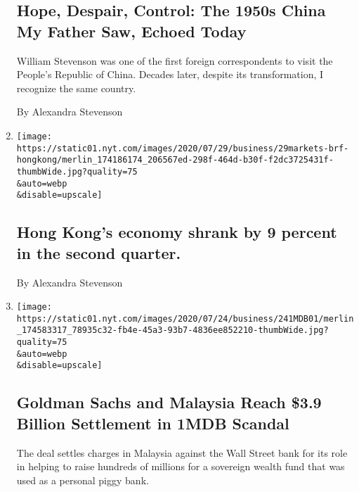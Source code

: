 \begin{enumerate}
  \hypertarget{hope-despair-control-the-1950s-china-my-father-saw-echoed-today}{%
  \subsection{Hope, Despair, Control: The 1950s China My Father Saw,
  Echoed
  Today}\label{hope-despair-control-the-1950s-china-my-father-saw-echoed-today}}

  William Stevenson was one of the first foreign correspondents to visit
  the People's Republic of China. Decades later, despite its
  transformation, I recognize the same country.

  By Alexandra Stevenson
\item
  \href{/2020/07/29/business/hong-kongs-economy-shrank-by-9-percent-in-the-second-quarter.html}{}

  \texttt{[image: https://static01.nyt.com/images/2020/07/29/business/29markets-brf-hongkong/merlin\_174186174\_206567ed-298f-464d-b30f-f2dc3725431f-thumbWide.jpg?quality=75\\\&auto=webp\\\&disable=upscale]}

  \hypertarget{hong-kongs-economy-shrank-by-9-percent-in-the-second-quarter}{%
  \subsection{Hong Kong's economy shrank by 9 percent in the second
  quarter.}\label{hong-kongs-economy-shrank-by-9-percent-in-the-second-quarter}}

  By Alexandra Stevenson
\item
  \href{/2020/07/24/business/goldman-sachs-malaysia-1mdb.html}{}

  \texttt{[image: https://static01.nyt.com/images/2020/07/24/business/241MDB01/merlin\_174583317\_78935c32-fb4e-45a3-93b7-4836ee852210-thumbWide.jpg?quality=75\\\&auto=webp\\\&disable=upscale]}

  \hypertarget{goldman-sachs-and-malaysia-reach-39-billion-settlement-in-1mdb-scandal}{%
  \subsection{Goldman Sachs and Malaysia Reach \$3.9 Billion Settlement
  in 1MDB
  Scandal}\label{goldman-sachs-and-malaysia-reach-39-billion-settlement-in-1mdb-scandal}}

  The deal settles charges in Malaysia against the Wall Street bank for
  its role in helping to raise hundreds of millions for a sovereign
  wealth fund that was used as a personal piggy bank.


\end{enumerate}
